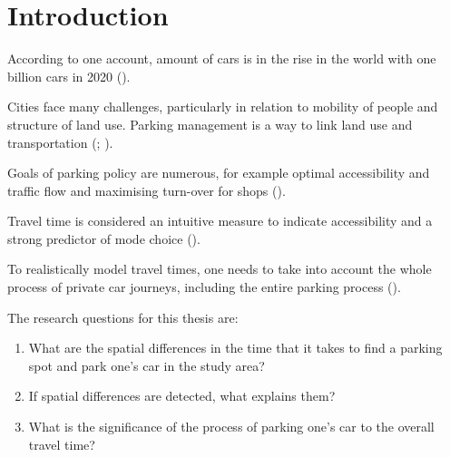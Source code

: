 \section{Introduction}
\justify


According to one account, amount of cars is in the rise in the world with one billion cars in 2020 (\cite{Sperling2009}).

Cities face many challenges, particularly in relation to mobility of people and structure of land use. Parking management is a way to link land use and transportation (\cite{Marsden2006TheReview}; \cite{Diallo2015MethodologyAnalysis}).

Goals of parking policy are numerous, for example optimal accessibility and traffic flow and maximising turn-over for shops (\cite{Marsden2006TheReview}). \par

Travel time is considered an intuitive measure to indicate accessibility and a strong predictor of mode choice (\cite{Frank2008UrbanChoice}).

To realistically model travel times, one needs to take into account the whole process of private car journeys, including the entire parking process (\cite{Salonen2013}).

\bigskip
\noindent
The research questions for this thesis are:

\begin{spacing}{1}
\begin{enumerate}[label=\Roman*] %
  \item What are the spatial differences in the time that it takes to find a parking spot and park one’s car in the study area?
  \item If spatial differences are detected, what explains them?
  \item What is the significance of the process of parking one’s car to the overall travel time?
\end{enumerate}
\end{spacing}